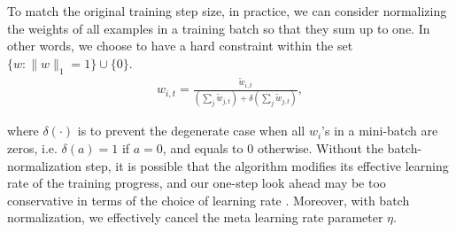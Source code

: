To match the original training step size, in practice, we can consider normalizing the weights of
all examples in a training batch so that they sum up to one. In other words, we choose to have
a hard constraint within the set $\{w: \lVert w \rVert_1 = 1 \} \cup \{0\}$.
\begin{align}
w_{i,t} = \frac{\tilde{w}_{i, t}}{(\sum_j \tilde{w}_{j, t}) + \delta(\sum_j \tilde{w}_{j, t})},
\end{align}

where $\delta(\cdot)$ is to prevent the degenerate case when all $w_i$'s in a mini-batch are zeros,
i.e. $\delta(a) = 1$ if $a = 0$, and equals to $0$ otherwise. Without the batch-normalization step,
it is possible that the algorithm modifies its effective learning rate of the training progress, and
our one-step look ahead may be too conservative in terms of the choice of learning rate
\cite{shorthorizon}. Moreover, with batch normalization, we effectively cancel the meta learning
rate parameter $\eta$.


